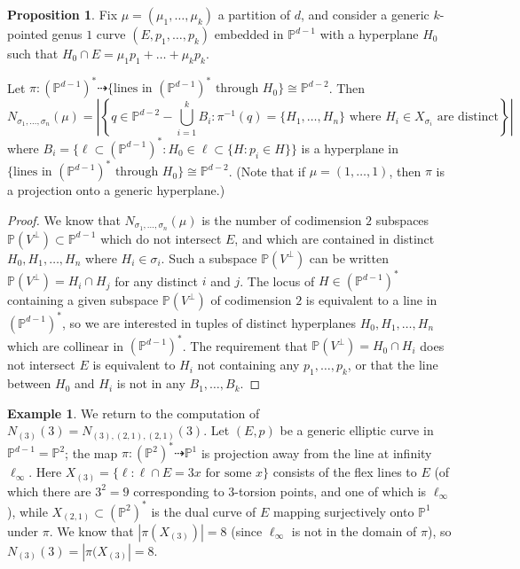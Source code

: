 \documentclass[11pt]{article}           %
\renewcommand{\P}{\mathbb P}
\theoremstyle{definition}
\newtheorem{prop}[thm]{Proposition}
\newtheorem{eg}[thm]{Example}
\begin{document}
\begin{prop}
  \label{prop:direct}
  Fix $\mu=(\mu_1,\dots,\mu_k)$ a partition of $d$, and consider
  a generic $k$-pointed
  genus $1$ curve $(E,p_1,\dots,p_k)$ embedded in $\P^{d-1}$ with a hyperplane
  $H_0$ such that $H_0\cap E = \mu_1p_1+\dots+\mu_kp_k$.
  
  Let $\pi:(\P^{d-1})^*\dashrightarrow\{\text{lines in }(\P^{d-1})^*\text{ through }H_0\}\cong \P^{d-2}$. Then
  \[
  N_{\sigma_1,\dots,\sigma_n}(\mu)=\left|\left\{q\in\P^{d-2}-\bigcup_{i=1}^kB_i:\pi^{-1}(q)=\{H_1,\dots,H_n\}\text{ where }H_i\in X_{\sigma_i}\text{ are distinct}\right\}\right|
  \]
  where $B_i=\{\ell\subset(\P^{d-1})^*:H_0\in \ell\subset\{H:p_i\in H\}\}$ is a hyperplane in $\{\text{lines in }(\P^{d-1})^*\text{ through }H_0\}\cong \P^{d-2}$.
     (Note that if $\mu=(1,\dots,1)$, then $\pi$ is a projection onto a generic hyperplane.)
\end{prop}
\begin{proof}
  We know that $N_{\sigma_1,\dots,\sigma_n}(\mu)$ is the number of codimension $2$
  subspaces $\P(V^{\perp})\subset\P^{d-1}$ which do not intersect $E$, and which are contained in distinct $H_0,H_1,\dots,H_n$ where $H_i\in\sigma_i$. Such a subspace
  $\P(V^{\perp})$ can be written $\P(V^{\perp})=H_i\cap H_j$ for any distinct $i$
  and $j$.
  The locus of $H\in(\P^{d-1})^*$ containing
  a given subspace $\P(V^{\perp})$ of codimension $2$ is equivalent to a
  line in $(\P^{d-1})^*$, so we are interested in
  tuples of distinct hyperplanes $H_0,H_1,\dots,H_n$ which are collinear in
  $(\P^{d-1})^*$. The requirement that $\P(V^{\perp})=H_0\cap H_i$ does not intersect $E$ is equivalent to $H_i$ not containing any $p_1,\dots,p_k$, or that
  the line between $H_0$ and $H_i$ is not in any $B_1,\dots,B_k$.
\end{proof}

\begin{eg}
  We return to the computation of $N_{(3)}(3)=N_{(3),(2,1),(2,1)}(3)$. Let $(E,p)$
  be a generic elliptic curve in $\P^{d-1}=\P^2$; the map $\pi:(\P^2)^*\dashrightarrow \P^1$ is projection away from the line at infinity $\ell_{\infty}$.
  Here $X_{(3)}=\{\ell:\ell\cap E=3x\text{ for some }x\}$ consists of the flex lines to $E$ (of which there are $3^2=9$ corresponding to $3$-torsion points, and one of which is $\ell_{\infty}$), while $X_{(2,1)}\subset (\P^2)^*$ is the dual curve of $E$ mapping surjectively onto $\P^1$ under $\pi$. We know that $|\pi(X_{(3)})|=8$ (since $\ell_{\infty}$ is not in the domain of $\pi$), so $N_{(3)}(3)=|\pi(X_{(3)}|=8$.
  \end{eg}
\end{document}
